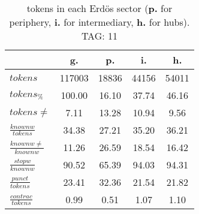 \begin{table}[h!]
\begin{center}
\begin{tabular}{| l || c | c | c | c |}\hline
 & {\bf g.} & {\bf p.} & {\bf i.} & {\bf h.} \\\hline\hline
$tokens$ & 117003  & 18836  & 44156  & 54011 \\
$tokens_{\%}$ & 100.00  & 16.10  & 37.74  & 46.16 \\
$tokens \neq$ & 7.11  & 13.28  & 10.94  & 9.56 \\\hline
$\frac{knownw}{tokens}$ & 34.38  & 27.21  & 35.20  & 36.21 \\
$\frac{knownw \neq}{knownw}$ & 11.26  & 26.59  & 18.54  & 16.42 \\\hline
$\frac{stopw}{knownw}$ & 90.52  & 65.39  & 94.03  & 94.31 \\
$\frac{punct}{tokens}$ & 23.41  & 32.36  & 21.54  & 21.82 \\
$\frac{contrac}{tokens}$ & 0.99  & 0.51  & 1.07  & 1.10 \\\hline
\end{tabular}
\caption{tokens in each Erd\"os sector ({{\bf p.}} for periphery, {{\bf i.}} for intermediary, 
    {{\bf h.}} for hubs). TAG: 11}
\end{center}
\end{table}